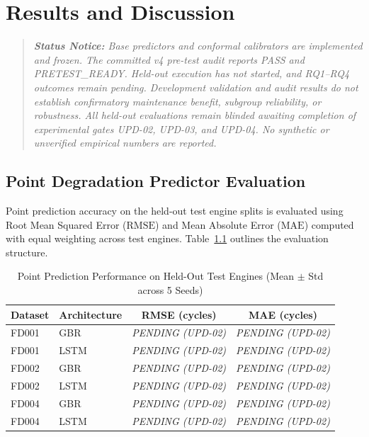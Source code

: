 \chapter{Results and Discussion}
\label{chap:results_discussion}

\begin{quote}
\itshape
\textbf{Status Notice:} Base predictors and conformal calibrators are implemented and frozen. The committed v4 pre-test audit reports PASS and PRETEST\_READY. Held-out execution has not started, and RQ1--RQ4 outcomes remain pending. Development validation and audit results do not establish confirmatory maintenance benefit, subgroup reliability, or robustness. All held-out evaluations remain blinded awaiting completion of experimental gates \emph{UPD-02}, \emph{UPD-03}, and \emph{UPD-04}. No synthetic or unverified empirical numbers are reported.
\end{quote}

\section{Point Degradation Predictor Evaluation}
Point prediction accuracy on the held-out test engine splits is evaluated using Root Mean Squared Error ($\text{RMSE}$) and Mean Absolute Error ($\text{MAE}$) computed with equal weighting across test engines. Table~\ref{tab:thesis_point_prediction} outlines the evaluation structure.

\begin{table}[htbp]
\centering
\caption{Point Prediction Performance on Held-Out Test Engines (Mean $\pm$ Std across 5 Seeds)}
\label{tab:thesis_point_prediction}
\begin{tabular}{llcc}
\toprule
\textbf{Dataset} & \textbf{Architecture} & \textbf{RMSE (cycles)} & \textbf{MAE (cycles)} \\
\midrule
FD001 & GBR  & \textit{PENDING (UPD-02)} & \textit{PENDING (UPD-02)} \\
FD001 & LSTM & \textit{PENDING (UPD-02)} & \textit{PENDING (UPD-02)} \\
\midrule
FD002 & GBR  & \textit{PENDING (UPD-02)} & \textit{PENDING (UPD-02)} \\
FD002 & LSTM & \textit{PENDING (UPD-02)} & \textit{PENDING (UPD-02)} \\
\midrule
FD004 & GBR  & \textit{PENDING (UPD-02)} & \textit{PENDING (UPD-02)} \\
FD004 & LSTM & \textit{PENDING (UPD-02)} & \textit{PENDING (UPD-02)} \\
\bottomrule
\end{tabular}
\end{table}

